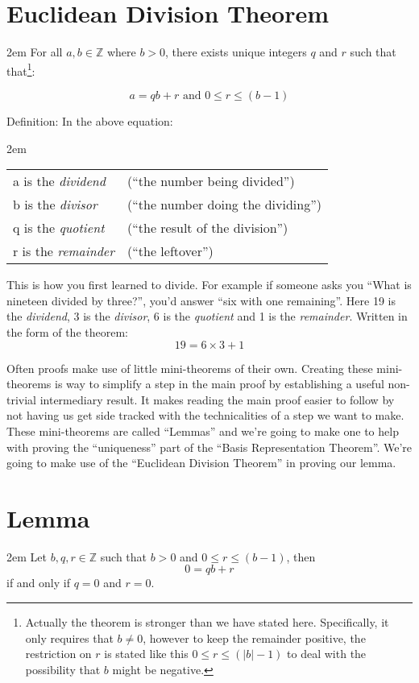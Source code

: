 \documentclass{article}
\newenvironment{jprIn}{\begin{adjustwidth}{2em}{}}{\end{adjustwidth}}
\begin{document}
\section*{Euclidean Division Theorem}
\begin{jprIn}
For all $a,b\in{}\mathbb{Z}$ where $b>0$, there exists unique integers $q$ and $r$ such
that
that\footnote{Actually the theorem is stronger than we have stated here. Specifically, it only requires that $b\ne0$, however
to keep the remainder positive, the restriction on $r$ is stated like
this $0 \le r \le (\left|b\right|-1)$ to deal with the possibility that $b$ might be negative.}:

\[a=qb+r  \text{ and } 0\le{}r\le{}(b-1)\]

Definition: In the above equation:
\begin{jprIn}
\begin{tabular}{l l}
a is the \emph{dividend} & (``the number being divided'')\\
b is the \emph{divisor} & (``the number doing the dividing'')\\
q is the \emph{quotient} & (``the result of the division'')\\
r is the \emph{remainder} & (``the leftover'')
\end{tabular}
\end{jprIn}
\end{jprIn}
This is how you first learned to divide.
For example if someone asks you ``What is nineteen divided by three?'', you’d
answer ``six with one remaining''. Here 19 is the \emph{dividend},  3 is the \emph{divisor},
6 is the \emph{quotient} and 1 is the \emph{remainder}. Written in the form of the theorem:
\[19=6\times3+1\]

Often proofs make use of little mini-theorems of their own.
Creating these mini-theorems is way to simplify a step in
the main proof by establishing a useful non-trivial
intermediary result. It makes reading the main proof
easier to follow by not having us get side tracked with
the technicalities of a step we want to make.
These mini-theorems are called ``Lemmas''
and we’re going to make one to help with proving the ``uniqueness'' part
of the ``Basis Representation Theorem''. We're going to make use of the
``Euclidean Division Theorem'' in proving our lemma.

\section*{Lemma}
\begin{jprIn}
Let $b, q, r \in{} \mathbb{Z}$ such that $b>0$ and $0\le{}r\le(b-1)$, then
\[0=qb+r\]
if and only if $q=0$ and $r=0$.
\end{jprIn}
\end{document}
